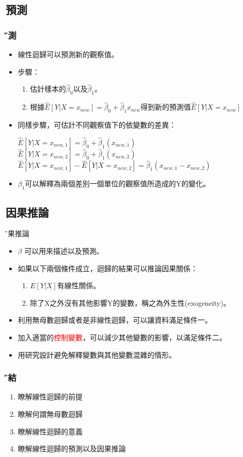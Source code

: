 \documentclass[xcolor=dvipsnames]{beamer}
\begin{document}
\subsection{預測}
\begin{frame}\frametitle{\H 預測}
\begin{itemize}
\item 線性迴歸可以預測新的觀察值。
\item 步驟：
\begin{enumerate}
\item 估計樣本的$\hat{\beta}_{0}$以及$\hat{\beta}_{1}$。
\item 根據$\hat{E}[Y|X=x_{new}]=\hat{\beta}_{0}+\hat{\beta}_{1}x_{new}$得到新的預測值$\hat{E}[Y|X=x_{new}]$
\end{enumerate}
\item 同樣步驟，可估計不同觀察值下的依變數的差異：
\begin{center}
$\hat{E}[Y|X=x_{new,1}]=\hat{\beta}_{0}+\hat{\beta}_{1}(x_{new,1})$\\
$\hat{E}[Y|X=x_{new,2}]=\hat{\beta}_{0}+\hat{\beta}_{1}(x_{new,2})$\\
$\hat{E}[Y|X=x_{new,1}]-\hat{E}[Y|X=x_{new,2}]=\hat{\beta}_{1}(x_{new,1}-x_{new,2})$
\end{center}

\item $\beta_{1}$可以解釋為兩個差別一個單位的觀察值所造成的Y的變化。

\end{itemize}
\end{frame}
\subsection{因果推論}
\begin{frame}{\H 因果推論}
\begin{itemize}
\item $ \beta $ 可以用來描述以及預測。
\item 如果以下兩個條件成立，迴歸的結果可以推論因果關係：
\begin{enumerate}
\item $E[Y|X]$有線性關係。
\item 除了X之外沒有其他影響Y的變數，稱之為外生性(exogeneity)。
\end{enumerate}
\item 利用無母數迴歸或者是非線性迴歸，可以讓資料滿足條件一。
\item 加入適當的{\textcolor{red}{控制變數}}，可以減少其他變數的影響，以滿足條件二。
\item 用研究設計避免解釋變數與其他變數混雜的情形。
\end{itemize}
\end{frame}

\begin{frame}\frametitle{\H 總結}
\begin{enumerate}
\item {\K 瞭解線性迴歸的前提}
\item {\K 瞭解何謂無母數迴歸}
\item {\K 瞭解線性迴歸的意義}
\item {\K 瞭解線性迴歸的預測以及因果推論}
\end{enumerate}
\end{frame}
\end{document}
